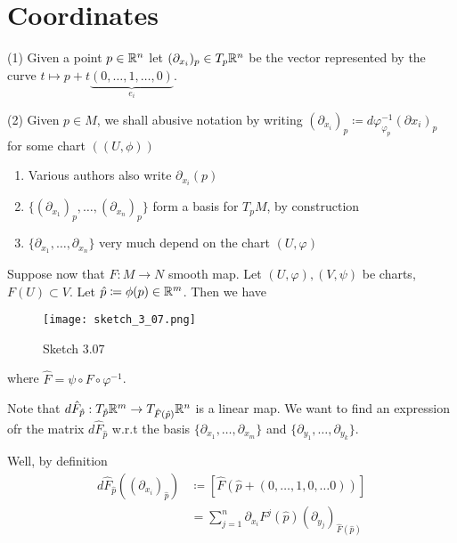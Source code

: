 \section{Coordinates}

\begin{definition*}
    (1) Given a point \(p\in\mathbb{R}^n\) let \((\partial_{x_i})_p\in T_p\mathbb{R}^n\) be the vector represented by 
    the curve \(t\mapsto p+t\underbrace{(0,\dots,1,\dots,0)}_{e_i}\).

    (2) Given \(p\in M\), we shall abusive notation by writing \((\partial_{x_i})_p\coloneqq d\varphi_{\varphi_p}^{-1}(\partial x_i)_p\) for some chart \(((U,\phi))\) 
\end{definition*}

\begin{remark}
    \begin{enumerate}
        \item Various authors also write \(\partial_{x_i}(p)\)
        \item  \(\{(\partial_{x_1})_p,\dots,(\partial_{x_n})_p\}\) form a basis for \(T_pM\), by construction
        \item \(\{\partial_{x_1},\dots,\partial_{x_n}\}\) very much depend on the chart \((U,\varphi)\)
    \end{enumerate}
\end{remark}

Suppose now that \(F:M\to N\) smooth map. Let \((U,\varphi),(V,\psi)\) be charts, \(F(U)\subset V\). Let 
\(\hat{p}\coloneqq \phi(p)\in\mathbb{R}^m\). Then we have 
\begin{figure}[H]
    \centering
    \texttt{[image: sketch\_3\_07.png]}
    \caption{Sketch 3.07}
\end{figure}
where \(\hat{F}=\psi\circ F\circ \varphi^{-1}\).

Note that \(d\hat{F}_{\hat{p}}:T_{\hat{p}}\mathbb{R}^m\to T_{\hat{F}(\hat{p})}\mathbb{R}^n\) is a linear map. We want to find 
an expression ofr the matrix  \(d\hat{F}_{\hat{p}}\) w.r.t the basis \(\{\partial_{x_1},\dots,\partial_{x_m}\}\) and \(\{\partial_{y_1},\dots,\partial_{y_k}\}\).

Well, by definition
\begin{align*}
    d\hat{F}_{\hat{p}}((\partial_{x_i})_{\hat{p}})&\coloneqq [\hat{F}(\hat{p}+(0,\dots,1,0,\dots 0))]\\
    &=\sum_{j=1}^n \partial_{{x_i}} F^j(\hat{p})(\partial_{y_j})_{\hat{F}(\hat{p})}
\end{align*}

